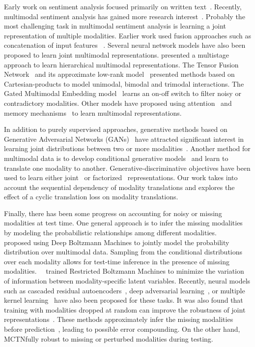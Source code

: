 \documentclass[letterpaper]{article} %
\newcommand{\citet}[1]{\citeauthor{#1}~\shortcite{#1}}
\newcommand{\citep}{\cite}
\newcommand{\ours}{MCTN}
\begin{document}
Early work on sentiment analysis focused primarily on written text~\citep{Pang:2002:TUS:1118693.1118704,pang2008opinion,socher2013recursive}. Recently, multimodal sentiment analysis has gained more research interest~\citep{mm_survey}.  Probably the most challenging task in multimodal sentiment analysis is learning a joint representation of multiple modalities. Earlier work used fusion approaches such as concatenation of input features ~\citep{ngiam2011multimodal,lazaridou2015combining}. Several neural network models have also been proposed to learn joint multimodal representations. \citep{multistage} presented a multistage approach to learn hierarchical multimodal representations. The Tensor Fusion Network~\citep{tensoremnlp17} and its approximate low-rank model~\citep{lowrank} presented methods based on Cartesian-products to model unimodal, bimodal and trimodal interactions. The Gated Multimodal Embedding model~\citep{chen2017msa} learns an on-off switch to filter noisy or contradictory modalities. Other models have proposed using attention~\citep{Cheng:2017:HMA:3077136.3080671} and memory mechanisms~\citep{zadeh2018memory} to learn multimodal representations.

In addition to purely supervised approaches, generative methods based on Generative Adversarial Networks (GANs)~\citep{gan} have attracted significant interest in learning joint distributions between two or more modalities~\citep{bigan,triplegan}. 
Another method for multimodal data is to develop conditional generative models~\citep{conditionalvae,variationalmultimodal} and learn to translate one modality to another. Generative-discriminative objectives have been used to learn either joint~\citep{seq2seq,kiros2014unifying} or factorized~\citep{factorized} representations. Our work takes into account the sequential dependency of modality translations and explores the effect of a cyclic translation loss on modality translations.

Finally, there has been some progress on accounting for noisy or missing modalities at test time. One general approach is to infer the missing modalities by modeling the probabilistic relationships among different modalities.~\citet{JMLR:v15:srivastava14b} proposed using Deep Boltzmann Machines to jointly model the probability distribution over multimodal data. Sampling from the conditional distributions over each modality allows for test-time inference in the presence of missing modalities.~\citet{NIPS2014_5279} trained Restricted Boltzmann Machines to minimize the variation of information between modality-specific latent variables. Recently, neural models such as cascaded residual autoencoders~\citep{DBLP:conf/cvpr/Tran0ZJ17}, deep adversarial learning~\citep{Cai:2018:DAL:3219819.3219963}, or multiple kernel learning~\citep{10.1007/978-3-642-15549-9_49} have also been proposed for these tasks. It was also found that training with modalities dropped at random can improve the robustness of joint representations~\citep{ngiam2011multimodal}. These methods approximately infer the missing modalities before prediction~\citep{Q14-1023,AAAI1714811}, leading to possible error compounding. On the other hand, \ours \remains fully robust to missing or perturbed modalities during testing. 
\end{document}

